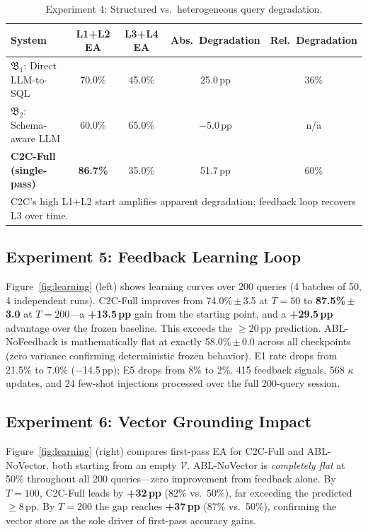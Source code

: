 \documentclass[11pt,a4paper]{article}
\begin{document}
\begin{table}[htbp]
\centering
\caption{Experiment 4: Structured vs.\ heterogeneous query degradation.}
\label{tab:hetero}
\small
\begin{tabular}{lcccc}
\toprule
\textbf{System} & \textbf{L1+L2 EA} & \textbf{L3+L4 EA} & \textbf{Abs.\ Degradation} & \textbf{Rel.\ Degradation} \\
\midrule
$\mathfrak{B}_1$: Direct LLM-to-SQL & 70.0\% & 45.0\% & 25.0\,pp & 36\% \\
$\mathfrak{B}_2$: Schema-aware LLM  & 60.0\% & 65.0\% & $-$5.0\,pp & n/a \\
\textbf{C2C-Full (single-pass)}     & \textbf{86.7\%} & 35.0\% & 51.7\,pp & 60\% \\
\midrule
\multicolumn{5}{l}{\footnotesize C2C's high L1+L2 start amplifies apparent degradation; feedback loop recovers L3 over time.} \\
\bottomrule
\end{tabular}
\end{table}

\subsection{Experiment 5: Feedback Learning Loop}\label{sec:exp5}

Figure~\ref{fig:learning} (left) shows learning curves over 200 queries (4 batches
of 50, 4 independent runs).  C2C-Full improves from 74.0\%\,$\pm$\,3.5 at $T{=}50$
to \textbf{87.5\%\,$\pm$\,3.0} at $T{=}200$---a \textbf{+13.5\,pp} gain from the
starting point, and a \textbf{+29.5\,pp} advantage over the frozen baseline.  This
exceeds the $\geq$20\,pp prediction.  ABL-NoFeedback is mathematically flat at
exactly 58.0\%\,$\pm$\,0.0 across all checkpoints (zero variance confirming
deterministic frozen behavior).  E1 rate drops from 21.5\% to 7.0\% ($-$14.5\,pp);
E5 drops from 8\% to 2\%.  415 feedback signals, 568 $\kappa$ updates, and 24
few-shot injections processed over the full 200-query session.

\subsection{Experiment 6: Vector Grounding Impact}\label{sec:exp6}

Figure~\ref{fig:learning} (right) compares first-pass EA for C2C-Full and
ABL-NoVector, both starting from an empty $\mathcal{V}$.  ABL-NoVector is
\emph{completely flat} at 50\% throughout all 200 queries---zero improvement from
feedback alone.  By $T{=}100$, C2C-Full leads by \textbf{+32\,pp} (82\% vs.\
50\%), far exceeding the predicted $\geq$8\,pp.  By $T{=}200$ the gap reaches
\textbf{+37\,pp} (87\% vs.\ 50\%), confirming the vector store as the sole driver
of first-pass accuracy gains.
\end{document}
